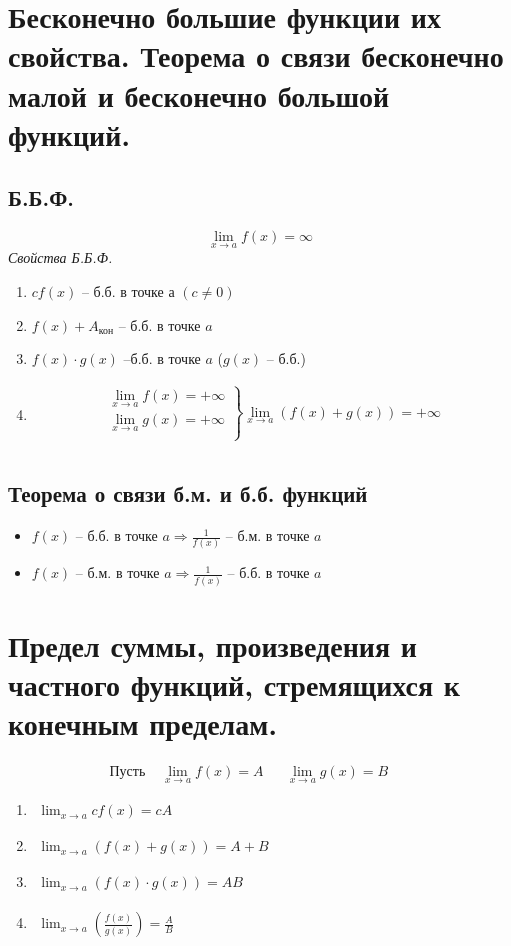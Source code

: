 \documentclass[12pt, fleqn]{article}
\begin{document}
\section{Бесконечно большие функции их свойства. Теорема о связи бесконечно малой и бесконечно большой функций.}
\subsection{Б.Б.Ф.}
$$\lim_{x\to a}f(x)=\infty$$
\textit{Свойства Б.Б.Ф.}
\begin{enumerate}
	\item $cf(x)$ -- б.б. в точке $а$ $(c\neq 0)$
	\item $f(x) + A_{\text{кон}}$ -- б.б. в точке $a$
	\item $f(x)\cdot g(x)$ --б.б. в точке $a$ ($g(x)$ -- б.б.)
	\item \begin{multline*}
		\left. \begin{gathered}
			\lim_{x\to a}f(x)=+\infty\\
			\lim_{x\to a}g(x)=+\infty\\
		\end{gathered}\right\}\lim_{x\to a}\left(f(x)+g(x)\right)=+\infty\\
	\end{multline*}
\end{enumerate}
\subsection{Теорема о связи б.м. и б.б. функций}
\begin{itemize}
	\item $f(x)$ -- б.б. в точке $a \Rightarrow \frac{1}{f(x)}$ -- б.м. в точке $a$
	\item $f(x)$ -- б.м. в точке $a \Rightarrow \frac{1}{f(x)}$ -- б.б. в точке $a$
\end{itemize}
\section{Предел суммы, произведения и частного функций, стремящихся к конечным пределам.}
\begin{align*}
	\text{Пусть  }&\lim_{x\to a} f(x) = A &&\lim_{x\to a} g(x)= B&&
\end{align*}
	\begin{enumerate}
		\item $\begin{gathered}\lim_{x\to a} cf(x)=cA\end{gathered}$
		\item $\begin{gathered}\lim_{x\to a} \left(f(x) + g(x)\right)=A+B\end{gathered}$
		\item $\begin{gathered}\lim_{x\to a} \left(f(x) \cdot g(x)\right)=AB\end{gathered}$
		\item $\begin{gathered}\lim_{x\to a} \left(\frac{f(x)}{g(x)}\right)=\frac{A}{B}\end{gathered}$
\end{enumerate}
\end{document}
